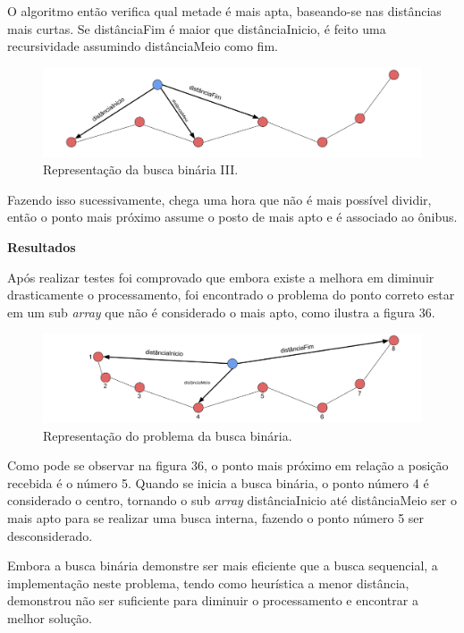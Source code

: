 \documentclass[
	12pt,				%
	oneside,			%
	a4paper,			%
	brazil				%
]{abntex2}
\begin{document}
{O algoritmo então verifica qual metade é mais apta, baseando-se nas distâncias mais curtas. Se distânciaFim é maior que distânciaInicio, é feito uma recursividade assumindo distânciaMeio como fim.

\begin{figure}[H]
\centering
\includegraphics[width=12cm, center]{images/nova-distancia.png}
\caption{Representação da busca binária III.}
\label{Rotulo}
\end{figure}

Fazendo isso sucessivamente, chega uma hora que não é mais possível dividir, então o ponto mais próximo assume o posto de mais apto e é associado ao ônibus.

\textbf{Resultados}

Após realizar testes foi comprovado que embora existe a melhora em diminuir drasticamente o processamento, foi encontrado o problema do ponto correto estar em um sub \textit{array} que não é considerado o mais apto, como ilustra a figura 36.

\begin{figure}[H]
\centering
\includegraphics[width=12cm, center]{images/busca-binaria-problema}
\caption{Representação do problema da busca binária.}
\label{binary-search-problem}
\end{figure}

Como pode se observar na figura 36, o ponto mais próximo em relação a posição recebida é o número 5. Quando se inicia a busca binária, o ponto número 4 é considerado o centro, tornando o sub \textit{array} distânciaInicio até distânciaMeio ser o mais apto para se realizar uma busca interna, fazendo o ponto número 5 ser desconsiderado.

Embora a busca binária demonstre ser mais eficiente que a busca sequencial, a implementação neste problema, tendo como heurística a menor distância, demonstrou não ser suficiente para diminuir o processamento e encontrar a melhor solução.

}
\end{document}

